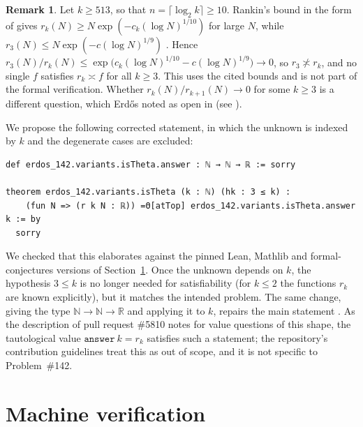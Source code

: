 \documentclass[11pt]{amsart}
\theoremstyle{plain}
\theoremstyle{definition}
\newtheorem{remark}[theorem]{Remark}
\newcommand{\N}{\mathbb{N}}
\newcommand{\R}{\mathbb{R}}
\begin{document}
\begin{remark}\label{rem:k3}
Let $k\ge513$, so that $n=\lceil\log_2k\rceil\ge10$. Rankin's bound in the form of \cite{OB11} gives $r_k(N)\ge N\exp(-c_k(\log N)^{1/10})$ for large $N$, while $r_3(N)\le N\exp(-c(\log N)^{1/9})$ \cite{BS23}. Hence $r_3(N)/r_k(N)\le\exp\bigl(c_k(\log N)^{1/10}-c(\log N)^{1/9}\bigr)\to0$, so $r_3\not\asymp r_k$, and no single $f$ satisfies $r_k\asymp f$ for all $k\ge3$. This uses the cited bounds and is not part of the formal verification. Whether $r_k(N)/r_{k+1}(N)\to0$ for some $k\ge3$ is a different question, which Erd\H{o}s noted as open in \cite{Er80} (see \cite{EP142}).
\end{remark}

We propose the following corrected statement, in which the unknown is indexed by $k$ and the degenerate cases are excluded:
\begin{lstlisting}
def erdos_142.variants.isTheta.answer : ℕ → ℕ → ℝ := sorry

theorem erdos_142.variants.isTheta (k : ℕ) (hk : 3 ≤ k) :
    (fun N => (r k N : ℝ)) =Θ[atTop] erdos_142.variants.isTheta.answer k := by
  sorry
\end{lstlisting}
We checked that this elaborates against the pinned Lean, Mathlib and formal-conjectures versions of Section~\ref{sec:lean}.
Once the unknown depends on $k$, the hypothesis $3\le k$ is no longer needed for satisfiability (for $k\le2$ the functions $r_k$ are known explicitly), but it matches the intended problem.
The same change, giving  the type $\N\to\N\to\R$ and applying it to $k$, repairs the main statement .
As the description of pull request \#5810 \cite{PR5810} notes for value questions of this shape, the tautological value $\texttt{answer}\ k = r_k$ satisfies such a statement; the repository's contribution guidelines treat this as out of scope, and it is not specific to Problem~\#142.

\section{Machine verification}\label{sec:lean}
\end{document}
